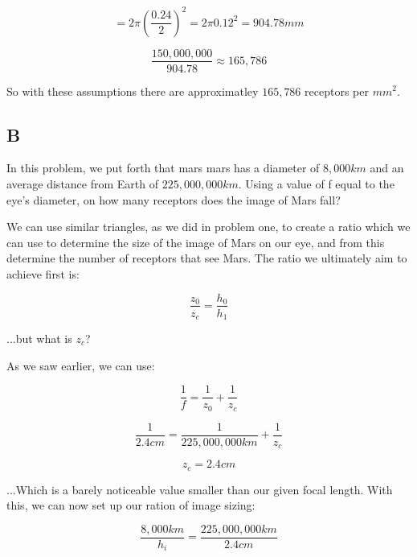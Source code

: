 \documentclass{article}
\begin{document}
\begin{equation}
    = 2 \pi (\frac{0.24}{2}) ^2 = 2 \pi 0.12^2 = 904.78 mm
\end{equation}

\begin{equation}
    \frac{150,000,000}{904.78} \approx 165,786
\end{equation}

So with these assumptions there are approximatley $165,786$ receptors per $mm^2$.

\subsection*{B}

In this problem, we put forth that mars mars has a diameter of $8,000km$ and an average distance from Earth of $225,000,000km$. Using a value of f equal to the eye's diameter, on how many receptors does the image of Mars fall?

We can use similar triangles, as we did in problem one, to create a ratio which we can use to determine the size of the image of Mars on our eye, and from this determine the number of receptors that see Mars. The ratio we ultimately aim to achieve first is:

\begin{equation}
    \frac{z_0}{z_c} = \frac{h_0}{h_1}
\end{equation}


...but what is $z_c$?

As we saw earlier, we can use:

\begin{equation}
    \frac{1}{f} = \frac{1}{z_0} + \frac{1}{z_c}
\end{equation}

\begin{equation}
    \frac{1}{2.4cm} = \frac{1}{225,000,000km} + \frac{1}{z_c}
\end{equation}

\begin{equation}
    z_c = 2.4cm
\end{equation}

...Which is a barely noticeable value smaller than our given focal length. With this, we can now set up our ration of image sizing:

\begin{equation}
    \frac{8,000km}{h_i} = \frac{225,000,000km}{2.4cm}
\end{equation}
\end{document}
